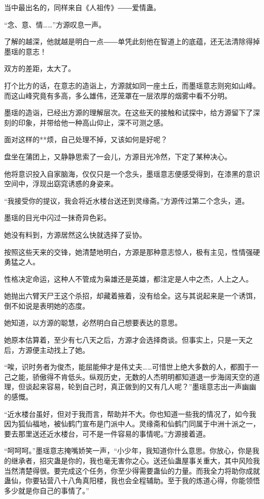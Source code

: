\begin{this_body}
当中最出名的，同样来自《人祖传》――爱情蛊。

“念、意、情……”方源叹息一声。

了解的越深，他就越是明白一点――单凭此刻他在智道上的底蕴，还无法清除得掉墨瑶的意志！

双方的差距，太大了。

打个比方的话，在意志的造诣上，方源就如同一座土丘，而墨瑶意志则宛如山峰。而这山峰究竟有多高，多么雄伟，还笼罩在一层浓厚的烟雾中看不分明。

墨瑶的造诣，已经出方源的理解层次。在这些天的接触和试探中，给方源留下了深刻的印象，并带给他一种高山仰止，深不可测之感。

面对这样的**烦，自己处理不掉，又该如何是好呢？

盘坐在蒲团上，又静静思索了一会儿，方源目光冷然，下定了某种决心。

他将意识投入自家脑海，仅仅只是一个念头，墨瑶意志便感受得到，在漆黑的意识空间中，浮现出窈窕诱惑的身姿来。

“我接受你的提议，我会将近水楼台送还到灵缘斋。”方源传过第二个念头，道。

墨瑶的目光中闪过一抹奇异色彩。

她没有料到，方源居然这么快就选择了妥协。

按照这些天来的交锋，她清楚地明白，方源是那种意志惊人，极有主见，性情强硬勇猛之人。

性格决定命运，这种人不管成为枭雄还是英雄，都注定是人中之杰，人上之人。

她抛出六臂天尸王这个杀招，却藏着掖着，没有给全。这与其说起来是一个诱饵，倒不如说是表明她的态度。

她知道，以方源的聪慧，必然明白自己想要表达的意思。

她原本估算着，至少有七八天之后，方源才会选择商谈。但事实上，只是一天之后，方源便主动找上了她。

“唉，识时务者为俊杰，能屈能伸才是伟丈夫……可惜世上绝大多数的人，都囿于一己之能，骄傲得不肯低头。纵观历史，无数的人杰明明都知道退一步海阔天空的道理，但谈起来容易，轮到自己时，真正做到的又有几人呢？”墨瑶意志出一声幽幽的感慨。

“近水楼台虽好，但对于我而言，帮助并不大。你也知道一些我的情况了，如今我因为狐仙福地，被仙鹤门宣布是门派中人。灵缘斋和仙鹤门同属于中洲十派之一，要去那里送还近水楼台，可不是一件容易的事情呢。”方源接着道。

“呵呵呵。”墨瑶意志掩嘴娇笑一声，“小少年，我知道你什么意思。你放心，你是我的继承者，招灾蛊是你的，我也毫无害你之心。送还仙蛊屋事关重大，其中风险我当然清楚得很。要完成这个任务，你至少得需要蛊仙的力量。而我全力将助你成就蛊仙，你要钻营八十八角真阳楼，我也会全程辅助。至于我的炼道心得，你能领悟多少就是你自己的事情了。”


\end{this_body}
